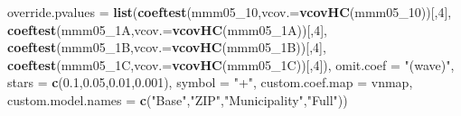 \documentclass[
]{article}
\newenvironment{Shaded}{\begin{snugshade}}{\end{snugshade}}
\newcommand{\DataTypeTok}[1]{\textcolor[rgb]{0.13,0.29,0.53}{#1}}
\newcommand{\DecValTok}[1]{\textcolor[rgb]{0.00,0.00,0.81}{#1}}
\newcommand{\FloatTok}[1]{\textcolor[rgb]{0.00,0.00,0.81}{#1}}
\newcommand{\KeywordTok}[1]{\textcolor[rgb]{0.13,0.29,0.53}{\textbf{#1}}}
\newcommand{\NormalTok}[1]{#1}
\newcommand{\StringTok}[1]{\textcolor[rgb]{0.31,0.60,0.02}{#1}}
\begin{document}
\begin{Shaded}
\begin{Highlighting}[]
          \DataTypeTok{override.pvalues =} \KeywordTok{list}\NormalTok{(}\KeywordTok{coeftest}\NormalTok{(mmm05_}\DecValTok{10}\NormalTok{,}\DataTypeTok{vcov.=}\KeywordTok{vcovHC}\NormalTok{(mmm05_}\DecValTok{10}\NormalTok{))[,}\DecValTok{4}\NormalTok{],}
                                  \KeywordTok{coeftest}\NormalTok{(mmm05_1A,}\DataTypeTok{vcov.=}\KeywordTok{vcovHC}\NormalTok{(mmm05_1A))[,}\DecValTok{4}\NormalTok{],}
                                  \KeywordTok{coeftest}\NormalTok{(mmm05_1B,}\DataTypeTok{vcov.=}\KeywordTok{vcovHC}\NormalTok{(mmm05_1B))[,}\DecValTok{4}\NormalTok{],}
                                  \KeywordTok{coeftest}\NormalTok{(mmm05_1C,}\DataTypeTok{vcov.=}\KeywordTok{vcovHC}\NormalTok{(mmm05_1C))[,}\DecValTok{4}\NormalTok{]),}
          \DataTypeTok{omit.coef =} \StringTok{"(wave)"}\NormalTok{, }\DataTypeTok{stars =} \KeywordTok{c}\NormalTok{(}\FloatTok{0.1}\NormalTok{,}\FloatTok{0.05}\NormalTok{,}\FloatTok{0.01}\NormalTok{,}\FloatTok{0.001}\NormalTok{), }\DataTypeTok{symbol =} \StringTok{"+"}\NormalTok{,}
          \DataTypeTok{custom.coef.map =}\NormalTok{ vnmap, }
          \DataTypeTok{custom.model.names =} \KeywordTok{c}\NormalTok{(}\StringTok{"Base"}\NormalTok{,}\StringTok{"ZIP"}\NormalTok{,}\StringTok{"Municipality"}\NormalTok{,}\StringTok{"Full"}\NormalTok{))}
\end{Highlighting}
\end{Shaded}
\end{document}
